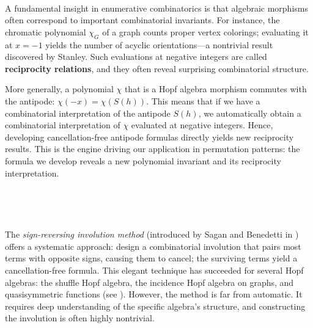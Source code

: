 \documentclass[12pt, reqno]{amsart}
\theoremstyle{definition}
\begin{document}
\

A fundamental insight in enumerative combinatorics is that algebraic morphisms often correspond to important combinatorial invariants.
For instance, the chromatic polynomial $\chi_G$ of a graph counts proper vertex colorings; evaluating it at $x=-1$ yields the number of acyclic orientations---a nontrivial result discovered by Stanley.
Such evaluations at negative integers are called \textbf{reciprocity relations}, and they often reveal surprising combinatorial structure.

More generally, a polynomial $\chi$ that is a Hopf algebra morphism commutes with the antipode: $\chi(-x) = \chi(S(h))$.
This means that if we have a combinatorial interpretation of the antipode $S(h)$, we automatically obtain a combinatorial interpretation of $\chi$ evaluated at negative integers.
Hence, developing cancellation-free antipode formulas directly yields new reciprocity results.
This is the engine driving our application in permutation patterns: the formula we develop reveals a new polynomial invariant and its reciprocity interpretation.

\




\

The \textit{sign-reversing involution method} (introduced by Sagan and Benedetti in \cite{BS2017}) offers a systematic approach: design a combinatorial involution that pairs most terms with opposite signs, causing them to cancel; the surviving terms yield a cancellation-free formula.
This elegant technique has succeeded for several Hopf algebras: the shuffle Hopf algebra, the incidence Hopf algebra on graphs, and quasisymmetric functions (see \cite{BS2017}).
However, the method is far from automatic.
It requires deep understanding of the specific algebra's structure, and constructing the involution is often highly nontrivial.
\end{document}
